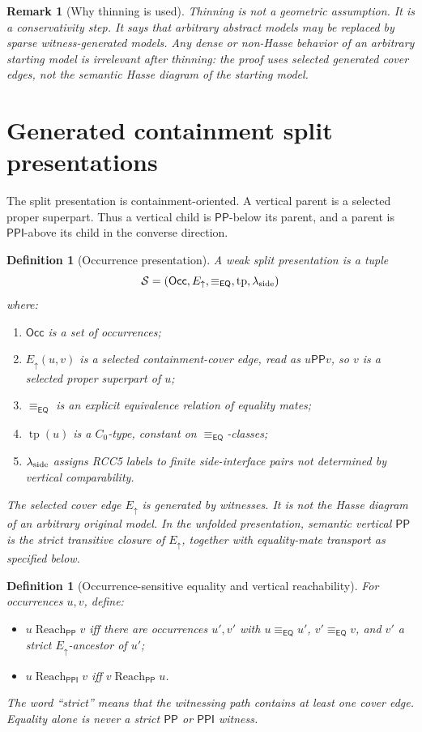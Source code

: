 \documentclass[11pt]{article}
\newtheorem{definition}[theorem]{Definition}
\newtheorem{remark}[theorem]{Remark}
\newcommand{\EQ}{\mathsf{EQ}}
\newcommand{\PP}{\mathsf{PP}}
\newcommand{\PPI}{\mathsf{PPI}}
\newcommand{\Occ}{\mathsf{Occ}}
\newcommand{\typ}{\operatorname{tp}}
\newcommand{\eqc}{\equiv_{\EQ}}
\newcommand{\reach}{\operatorname{Reach}}
\begin{document}
\begin{remark}[Why thinning is used]
Thinning is not a geometric assumption.  It is a conservativity step.  It says that arbitrary abstract models may be replaced by sparse witness-generated models.  Any dense or non-Hasse behavior of an arbitrary starting model is irrelevant after thinning: the proof uses selected generated cover edges, not the semantic Hasse diagram of the starting model.
\end{remark}

\section{Generated containment split presentations}

The split presentation is containment-oriented.  A vertical parent is a selected proper superpart.  Thus a vertical child is \(\PP\)-below its parent, and a parent is \(\PPI\)-above its child in the converse direction.

\begin{definition}[Occurrence presentation]
A weak split presentation is a tuple
\[
  \mathcal S=(\Occ,E_\uparrow,\eqc,\typ,\lambda_{\rm side})
\]
where:
\begin{enumerate}[label=(S\arabic*)]
\item \(\Occ\) is a set of occurrences;
\item \(E_\uparrow(u,v)\) is a selected containment-cover edge, read as \(u\PP v\), so \(v\) is a selected proper superpart of \(u\);
\item \(\eqc\) is an explicit equivalence relation of equality mates;
\item \(\typ(u)\) is a \(C_0\)-type, constant on \(\eqc\)-classes;
\item \(\lambda_{\rm side}\) assigns RCC5 labels to finite side-interface pairs not determined by vertical comparability.
\end{enumerate}
The selected cover edge \(E_\uparrow\) is generated by witnesses.  It is not the Hasse diagram of an arbitrary original model.  In the unfolded presentation, semantic vertical \(\PP\) is the strict transitive closure of \(E_\uparrow\), together with equality-mate transport as specified below.
\end{definition}

\begin{definition}[Occurrence-sensitive equality and vertical reachability]\label{def:eq-aware-reach}
For occurrences \(u,v\), define:
\begin{itemize}
\item \(u\reach_\PP v\) iff there are occurrences \(u',v'\) with \(u\eqc u'\), \(v'\eqc v\), and \(v'\) a strict \(E_\uparrow\)-ancestor of \(u'\);
\item \(u\reach_\PPI v\) iff \(v\reach_\PP u\).
\end{itemize}
The word ``strict'' means that the witnessing path contains at least one cover edge.  Equality alone is never a strict \(\PP\) or \(\PPI\) witness.
\end{definition}
\end{document}
